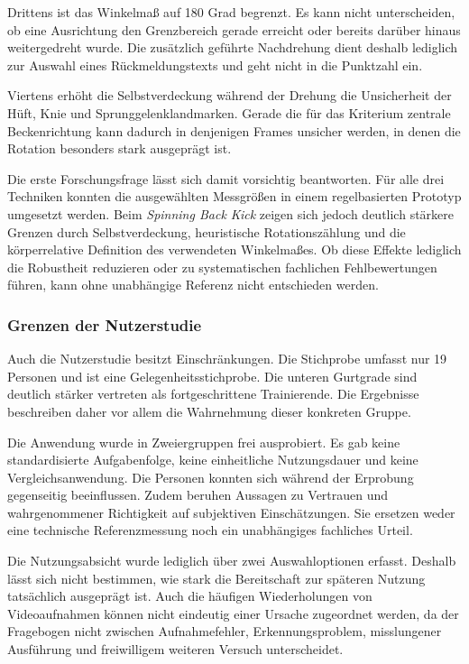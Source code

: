 \documentclass[intern]{cgMA}
\begin{document}
Drittens ist das Winkelmaß auf 180 Grad begrenzt. Es kann nicht unterscheiden, ob eine Ausrichtung den Grenzbereich gerade erreicht oder bereits darüber hinaus weitergedreht wurde. Die zusätzlich geführte Nachdrehung dient deshalb lediglich zur Auswahl eines Rückmeldungstexts und geht nicht in die Punktzahl ein.

Viertens erhöht die Selbstverdeckung während der Drehung die Unsicherheit der Hüft, Knie und Sprunggelenklandmarken. Gerade die für das Kriterium zentrale Beckenrichtung kann dadurch in denjenigen Frames unsicher werden, in denen die Rotation besonders stark ausgeprägt ist.

Die erste Forschungsfrage lässt sich damit vorsichtig beantworten. Für alle drei Techniken konnten die ausgewählten Messgrößen in einem regelbasierten Prototyp umgesetzt werden. Beim \textit{Spinning Back Kick} zeigen sich jedoch deutlich stärkere Grenzen durch Selbstverdeckung, heuristische Rotationszählung und die körperrelative Definition des verwendeten Winkelmaßes. Ob diese Effekte lediglich die Robustheit reduzieren oder zu systematischen fachlichen Fehlbewertungen führen, kann ohne unabhängige Referenz nicht entschieden werden.

\subsubsection{Grenzen der Nutzerstudie}
Auch die Nutzerstudie besitzt Einschränkungen. Die Stichprobe umfasst nur 19 Personen und ist eine Gelegenheitsstichprobe. Die unteren Gurtgrade sind deutlich stärker vertreten als fortgeschrittene Trainierende. Die Ergebnisse beschreiben daher vor allem die Wahrnehmung dieser konkreten Gruppe.

Die Anwendung wurde in Zweiergruppen frei ausprobiert. Es gab keine standardisierte Aufgabenfolge, keine einheitliche Nutzungsdauer und keine Vergleichsanwendung. Die Personen konnten sich während der Erprobung gegenseitig beeinflussen. Zudem beruhen Aussagen zu Vertrauen und wahrgenommener Richtigkeit auf subjektiven Einschätzungen. Sie ersetzen weder eine technische Referenzmessung noch ein unabhängiges fachliches Urteil.

Die Nutzungsabsicht wurde lediglich über zwei Auswahloptionen erfasst. Deshalb lässt sich nicht bestimmen, wie stark die Bereitschaft zur späteren Nutzung tatsächlich ausgeprägt ist. Auch die häufigen Wiederholungen von Videoaufnahmen können nicht eindeutig einer Ursache zugeordnet werden, da der Fragebogen nicht zwischen Aufnahmefehler, Erkennungsproblem, misslungener Ausführung und freiwilligem weiteren Versuch unterscheidet.
\end{document}
